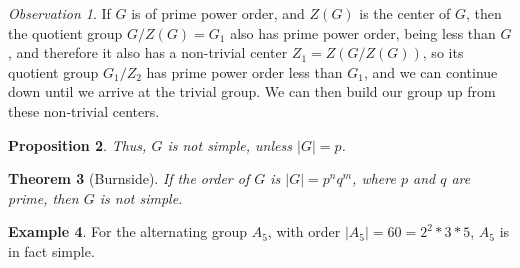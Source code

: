 \documentclass[12pt]{article}
\newtheorem{thm}{Theorem}[section]
\newtheorem{prop}[thm]{Proposition}
\theoremstyle{definition}
\newtheorem{eg}[thm]{Example}
\theoremstyle{remark}
\newtheorem{obs}[thm]{Observation}
\numberwithin{equation}{section}
\begin{document}
\vspace{15pt}

\begin{obs}
        If $G$ is of prime power order, and $Z(G)$ is the center of $G$, then the quotient group $G/Z(G) = G_1$ also has prime power order, being less than $G$, and therefore it also has a non-trivial center $Z_1 = Z(G/Z(G))$, so its quotient group $G_1/Z_2$ has prime power order less than $G_1$, and we can continue down until we arrive at the trivial group. We can then build our group up from these non-trivial centers.
\end{obs}

\vspace{15pt}

\begin{prop}
        Thus, $G$ is not simple, unless $|G| = p$.
\end{prop}

\vspace{15pt}

\begin{thm}[Burnside]
        If the order of $G$ is $|G| = p^nq^m$, where $p$ and $q$ are prime, then $G$ is \emph{not} simple.
\end{thm}

\vspace{15pt}

\begin{eg}
        For the alternating group $A_5$, with order $|A_5| = 60 = 2^2*3*5$, $A_5$ is in fact simple.
\end{eg}


\vspace{15pt}
\end{document}
